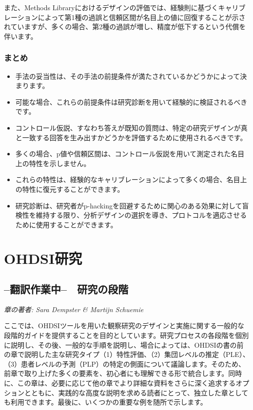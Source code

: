 \documentclass[
  11pt]{book}
\makeatletter
\providecommand{\tightlist}{%
  \setlength{\itemsep}{0pt}\setlength{\parskip}{0pt}}
\newenvironment{kframe}{%
\medskip{}
\setlength{\fboxsep}{.8em}
 \def\at@end@of@kframe{}%
 \ifinner\ifhmode%
  \def\at@end@of@kframe{\end{minipage}}%
  \begin{minipage}{\columnwidth}%
 \fi\fi%
 \def\FrameCommand##1{\hskip\@totalleftmargin \hskip-\fboxsep
 \colorbox{myShadeColor}{##1}\hskip-\fboxsep
     \hskip-\linewidth \hskip-\@totalleftmargin \hskip\columnwidth}%
 \MakeFramed {\advance\hsize-\width
   \@totalleftmargin\z@ \linewidth\hsize
   \@setminipage}}%
 {\par\unskip\endMakeFramed%
 \at@end@of@kframe}
\newenvironment{rmdblock}[1]
  {
  \begin{itemize}
  \renewcommand{\labelitemi}{
    \raisebox{-.7\height}[0pt][0pt]{
      {\setkeys{Gin}{width=3em,keepaspectratio}\texttt{[image: images/\#1]}}
    }
  }
  \setlength{\fboxsep}{1em}
  \begin{kframe}
  \item
  }
  {
  \end{kframe}
  \end{itemize}
  }
\newenvironment{rmdsummary}
  {\begin{rmdblock}{summary}}
  {\end{rmdblock}}
\theoremstyle{definition}
\theoremstyle{definition}
\theoremstyle{definition}
\theoremstyle{definition}
\theoremstyle{remark}
\makeatother
\begin{document}
また、Methods Libraryにおけるデザインの評価では、経験則に基づくキャリブレーションによって第1種の過誤と信頼区間が名目上の値に回復することが示されていますが、多くの場合、第2種の過誤が増し、精度が低下するという代償を伴います。

\section{まとめ}\label{ux307eux3068ux3081-15}

\begin{rmdsummary}
\begin{itemize}
\tightlist
\item
  手法の妥当性は、その手法の前提条件が満たされているかどうかによって決まります。
\item
  可能な場合、これらの前提条件は研究診断を用いて経験的に検証されるべきです。
\item
  コントロール仮説、すなわち答えが既知の質問は、特定の研究デザインが真と一致する回答を生み出すかどうかを評価するために使用されるべきです。
\item
  多くの場合、p値や信頼区間は、コントロール仮説を用いて測定された名目上の特性を示しません。
\item
  これらの特性は、経験的なキャリブレーションによって多くの場合、名目上の特性に復元することができます。
\item
  研究診断は、研究者がp-hackingを回避するために関心のある効果に対して盲検性を維持する限り、分析デザインの選択を導き、プロトコルを適応させるために使用することができます。
\end{itemize}
\end{rmdsummary}

\part{OHDSI研究}\label{part-ohdsiux7814ux7a76}

\chapter{--翻訳作業中--　研究の段階}\label{StudySteps}

\emph{章の著者: Sara Dempster \& Martijn Schuemie}

ここでは、OHDSIツールを用いた観察研究のデザインと実施に関する一般的な段階的ガイドを提供することを目的としています。研究プロセスの各段階を個別に説明し、その後、一般的な手順を説明し、場合によっては、OHDSIの書の前の章で説明した主な研究タイプ（1）特性評価、（2）集団レベルの推定（PLE）、（3）患者レベルの予測（PLP）の特定の側面について議論します。そのため、前章で取り上げた多くの要素を、初心者にも理解できる形で統合します。同時に、この章は、必要に応じて他の章でより詳細な資料をさらに深く追求するオプションとともに、実践的な高度な説明を求める読者にとって、独立した章としても利用できます。最後に、いくつかの重要な例を随所で示します。
\end{document}
